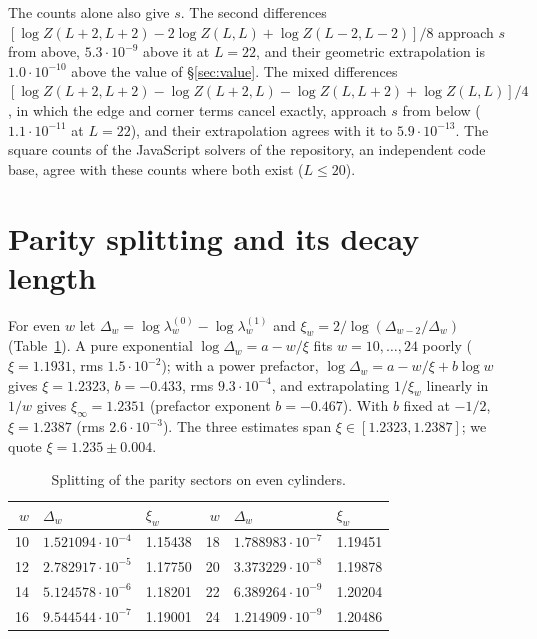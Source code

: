 \documentclass[11pt]{amsart}
\theoremstyle{definition}
\theoremstyle{remark}
\begin{document}
The counts alone also give $s$. The second differences
$[\log Z(L+2, L+2) - 2\log Z(L, L) + \log Z(L-2, L-2)]/8$ approach $s$ from above, $5.3\cdot10^{-9}$
above it at $L = 22$, and their geometric extrapolation is $1.0\cdot10^{-10}$ above the value of
\S\ref{sec:value}. The mixed differences
$[\log Z(L+2, L+2) - \log Z(L+2, L) - \log Z(L, L+2) + \log Z(L, L)]/4$, in which the edge and
corner terms cancel exactly, approach $s$ from below ($1.1\cdot10^{-11}$ at $L = 22$), and their
extrapolation agrees with it to $5.9\cdot10^{-13}$. The square counts of the JavaScript solvers of
the repository, an independent code base, agree with these counts where both exist ($L \le 20$).

\section{Parity splitting and its decay length}\label{sec:z2}
For even $w$ let $\Delta_w = \log\lambda^{(0)}_w - \log\lambda^{(1)}_w$ and
$\xi_w = 2/\log(\Delta_{w-2}/\Delta_w)$ (Table~\ref{tab:z2}). A pure exponential
$\log\Delta_w = a - w/\xi$ fits $w = 10, \dots, 24$ poorly ($\xi = 1.1931$, rms $1.5\cdot10^{-2}$);
with a power prefactor, $\log\Delta_w = a - w/\xi + b\log w$ gives $\xi = 1.2323$, $b = -0.433$,
rms $9.3\cdot10^{-4}$, and extrapolating $1/\xi_w$ linearly in $1/w$ gives $\xi_\infty = 1.2351$
(prefactor exponent $b = -0.467$). With $b$ fixed at $-1/2$, $\xi = 1.2387$ (rms $2.6\cdot10^{-3}$).
The three estimates span $\xi \in [1.2323, 1.2387]$; we quote $\xi = 1.235 \pm 0.004$.

\begin{table}[ht]
\caption{Splitting of the parity sectors on even cylinders.}\label{tab:z2}
\begin{tabular}{rll@{\qquad}rll}
\toprule
$w$ & $\Delta_w$ & $\xi_w$ & $w$ & $\Delta_w$ & $\xi_w$ \\
\midrule
10 & $1.521094\cdot10^{-4}$ & 1.15438 & 18 & $1.788983\cdot10^{-7}$ & 1.19451 \\
12 & $2.782917\cdot10^{-5}$ & 1.17750 & 20 & $3.373229\cdot10^{-8}$ & 1.19878 \\
14 & $5.124578\cdot10^{-6}$ & 1.18201 & 22 & $6.389264\cdot10^{-9}$ & 1.20204 \\
16 & $9.544544\cdot10^{-7}$ & 1.19001 & 24 & $1.214909\cdot10^{-9}$ & 1.20486 \\
\bottomrule
\end{tabular}
\end{table}
\end{document}
